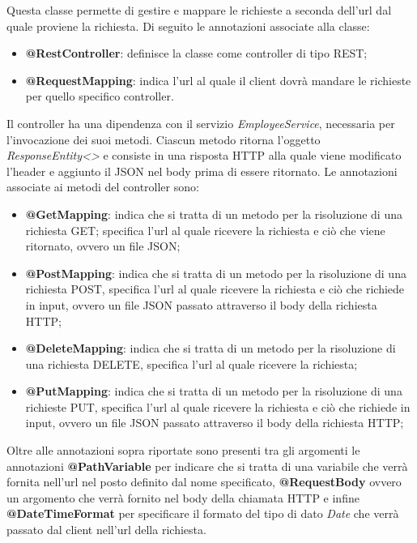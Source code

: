 Questa classe permette di gestire e mappare le richieste a seconda dell'url dal quale proviene la richiesta. Di seguito le annotazioni associate alla classe:
\begin{itemize}
  \item \textbf{@RestController}: definisce la classe come controller di tipo REST;
  \item \textbf{@RequestMapping}: indica l'url al quale il client dovrà mandare le richieste per quello specifico controller.
\end{itemize}
Il controller ha una dipendenza con il servizio \textit{EmployeeService}, necessaria per l'invocazione dei suoi metodi. Ciascun metodo ritorna l'oggetto \textit{ResponseEntity<>} e consiste in una risposta HTTP alla quale viene modificato l'header e aggiunto il JSON nel body prima di essere ritornato. Le annotazioni associate ai metodi del controller sono:
\begin{itemize}
  \item \textbf{@GetMapping}: indica che si tratta di un metodo per la risoluzione di una richiesta GET; specifica l'url al quale ricevere la richiesta e ciò che viene ritornato, ovvero un file JSON;
  \item \textbf{@PostMapping}: indica che si tratta di un metodo per la risoluzione di una richiesta POST, specifica l'url al quale ricevere la richiesta e ciò che richiede in input, ovvero un file JSON passato attraverso il body della richiesta HTTP;
  \item  \textbf{@DeleteMapping}: indica che si tratta di un metodo per la risoluzione di una richiesta DELETE, specifica l'url al quale ricevere la richiesta;
  \item \textbf{@PutMapping}: indica che si tratta di un metodo per la risoluzione di una richieste PUT, specifica l'url al quale ricevere la richiesta e ciò che richiede in input, ovvero un file JSON passato attraverso il body della richiesta HTTP;
\end{itemize}
Oltre alle annotazioni sopra riportate sono presenti tra gli argomenti le annotazioni \textbf{@PathVariable} per indicare che si tratta di una variabile che verrà fornita nell'url nel posto definito dal nome specificato, \textbf{@RequestBody} ovvero un argomento che verrà fornito nel body della chiamata HTTP e infine \textbf{@DateTimeFormat} per specificare il formato del tipo di dato \textit{Date} che verrà passato dal client nell'url della richiesta.\\
